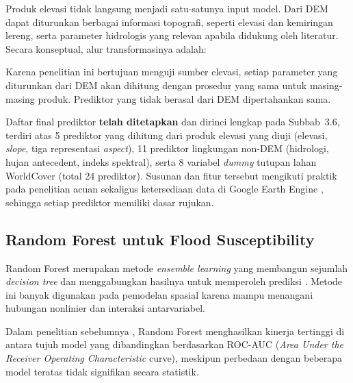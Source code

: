 \documentclass[12pt]{article}
\begin{document}
Produk elevasi tidak langsung menjadi satu-satunya input model. Dari DEM
dapat diturunkan berbagai informasi topografi, seperti elevasi dan kemiringan
lereng, serta parameter hidrologis yang relevan apabila didukung oleh
literatur. Secara konseptual, alur transformasinya adalah:

\begin{center}
\end{center}

Karena penelitian ini bertujuan menguji sumber elevasi, setiap parameter yang
diturunkan dari DEM akan dihitung dengan prosedur yang sama untuk
masing-masing produk. Prediktor yang tidak berasal dari DEM dipertahankan
sama.

Daftar final prediktor \textbf{telah ditetapkan} dan dirinci lengkap pada
Subbab~3.6, terdiri atas 5 prediktor yang dihitung dari produk elevasi yang
diuji (elevasi, \textit{slope}, tiga representasi \textit{aspect}), 11
prediktor lingkungan non-DEM (hidrologi, hujan antecedent, indeks spektral),
serta 8 variabel \textit{dummy} tutupan lahan WorldCover (total 24
prediktor). Susunan dan fitur tersebut mengikuti praktik pada penelitian
acuan sekaligus ketersediaan data di Google Earth Engine
\cite{hakim2026}, sehingga setiap prediktor memiliki dasar rujukan.

\subsection{Random Forest untuk Flood Susceptibility}

Random Forest merupakan metode \textit{ensemble learning} yang membangun
sejumlah \textit{decision tree} dan menggabungkan hasilnya untuk memperoleh
prediksi \cite{breiman2001}. Metode ini banyak digunakan pada pemodelan
spasial karena mampu menangani hubungan nonlinier dan interaksi
antarvariabel.

Dalam penelitian sebelumnya \cite{hakim2026}, Random Forest menghasilkan
kinerja tertinggi di antara tujuh model yang dibandingkan berdasarkan
ROC-AUC (\textit{Area Under the Receiver Operating Characteristic} curve),
meskipun perbedaan dengan beberapa model teratas tidak signifikan secara
statistik.
\end{document}
